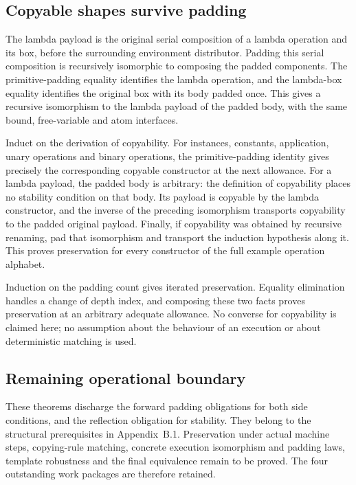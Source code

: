 \subsection{Copyable shapes survive padding}
The lambda payload is the original serial composition of a lambda operation
and its box, before the surrounding environment distributor. Padding this
serial composition is recursively isomorphic to composing the padded
components. The primitive-padding equality identifies the lambda operation,
and the lambda-box equality identifies the original box with its body padded
once. This gives a recursive isomorphism to the lambda payload of the padded
body, with the same bound, free-variable and atom interfaces.

Induct on the derivation of copyability. For instances, constants,
application, unary operations and binary operations, the primitive-padding
identity gives precisely the corresponding copyable constructor at the next
allowance. For a lambda payload, the padded body is arbitrary: the definition
of copyability places no stability condition on that body. Its payload is
copyable by the lambda constructor, and the inverse of the preceding
isomorphism transports copyability to the padded original payload. Finally,
if copyability was obtained by recursive renaming, pad that isomorphism and
transport the induction hypothesis along it. This proves preservation for
every constructor of the full example operation alphabet.

Induction on the padding count gives iterated preservation. Equality
elimination handles a change of depth index, and composing these two facts
proves preservation at an arbitrary adequate allowance. No converse for
copyability is claimed here; no assumption about the behaviour of an
execution or about deterministic matching is used.

\subsection{Remaining operational boundary}
These theorems discharge the forward padding obligations for both side
conditions, and the reflection obligation for stability. They belong to the
structural prerequisites in Appendix~B.1. Preservation under actual machine
steps, copying-rule matching, concrete execution isomorphism and padding laws,
template robustness and the final equivalence remain to be proved. The four
outstanding work packages are therefore retained.

